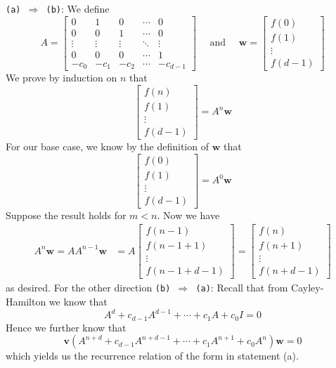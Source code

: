 \documentclass{article}
\newenvironment{solution}[1][\proofname]{
    \proof[\textbf{Solution:}] \renewcommand{\qedsymbol}{$\bell$}
}{\endproof}
\begin{document}
\begin{solution}
    \texttt{(a) $\Rightarrow$ (b)}: We define 
    \[ A = \begin{bmatrix}
        0 & 1 & 0 & \cdots & 0 \\ 
        0 & 0 & 1 & \cdots & 0 \\ 
        \vdots & \vdots & \vdots & \ddots & \vdots \\ 
        0 & 0 & 0 & \cdots & 1 \\ 
        -c_0 & -c_1 & -c_2 & \cdots & -c_{d-1} 
    \end{bmatrix} \quad \text{ and } \quad \mathbf{w}= \begin{bmatrix}
        f(0) \\ f(1) \\ \vdots \\ f(d-1) 
    \end{bmatrix} \]
    We prove by induction on $n$ that 
    \[ \begin{bmatrix}
        f(n) \\ f(1) \\ \vdots \\ f(d-1) 
    \end{bmatrix} = A^n \mathbf{w} \] 
    For our base case, we know by the definition of $\mathbf{w}$ that 
    \[ \begin{bmatrix}
        f(0) \\ f(1) \\ \vdots \\ f(d-1) 
    \end{bmatrix} = A^0 \mathbf{w} \] 
    Suppose the result holds for $m < n$. Now we have 
    \begin{align*}
        A^n \mathbf{w} = A A^{n-1} \mathbf{w} 
        & = A \begin{bmatrix}
            f(n-1) \\ f(n-1+1) \\ \vdots \\ f(n-1+d-1) 
        \end{bmatrix} = \begin{bmatrix}
            f(n) \\ f(n+1) \\ \vdots \\ f(n+d-1) 
        \end{bmatrix}
    \end{align*}
    as desired. For the other direction \texttt{(b) $\Rightarrow$ (a)}: Recall that from Cayley-Hamilton we know that 
    \[ A^d + c_{d-1} A^{d-1} + \cdots + c_1 A + c_0 I = 0 \]
    Hence we further know that 
    \[ \mathbf{v} \left( A^{n+d} + c_{d-1} A^{n+d-1} + \cdots + c_1 A^{n+1} + c_0 A^n \right) \mathbf{w} = 0 \]
    which yields us the recurrence relation of the form in statement (a). 
\end{solution}
\end{document}
